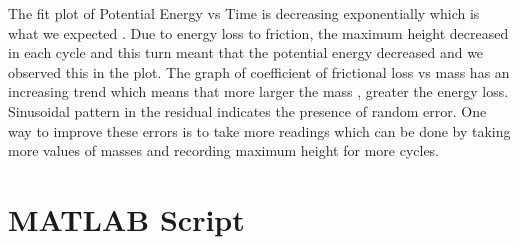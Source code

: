 The fit plot of Potential Energy vs Time is decreasing exponentially which is what we expected . Due to energy loss to friction, the maximum height decreased in each cycle and this turn meant that the potential energy decreased and we observed this in the plot. The graph of coefficient of frictional loss  vs mass has an increasing trend which means that more larger the mass , greater the energy loss. Sinusoidal pattern in the residual indicates the presence of random error. One way to improve these errors is to take more readings which can be done by taking more values of masses and recording maximum height for more cycles. 


\section{MATLAB Script}





